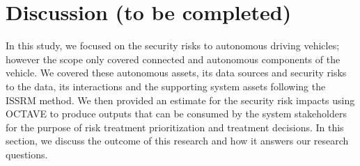 \documentclass[runningheads]{llncs}
\begin{document}
\begin{table}[h!]
\caption{Case analysis: R6 mitigation}
\label{tab:mitigation-example}
 \vspace{-10pt}  
\end{table}


\section{Discussion (to be completed)}
\label{sec:disc}
In this study, we focused on the security risks to autonomous driving vehicles; however the scope only covered connected and autonomous components of the vehicle. We covered these autonomous assets, its data sources and security risks to the data, its interactions and the supporting system assets following the ISSRM method. We then provided an estimate for the security risk impacts using OCTAVE to produce outputs that can be consumed by the system stakeholders for the purpose of risk treatment prioritization and treatment decisions. In this section, we discuss the outcome of this research and how it answers our research questions.
\end{document}
